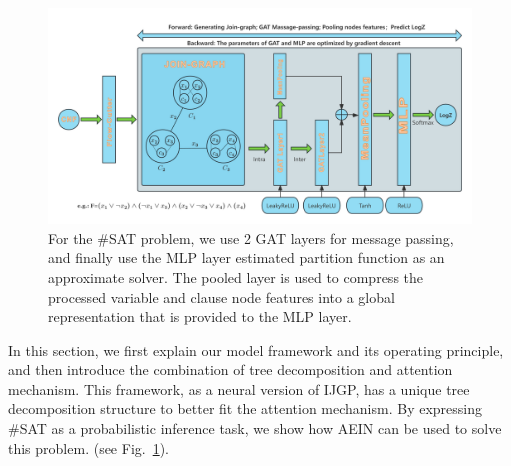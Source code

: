 \begin{figure}[h]
\centering 
\includegraphics[width=1\textwidth]{png/AEIN2.png}
\caption{For the \#SAT problem, we use 2 GAT layers for message passing, and finally use the MLP layer estimated partition function as an approximate solver. The pooled layer is used to compress the processed variable and clause node features into a global representation that is provided to the MLP layer.} \label{fig1}
\end{figure}
In this section, we first explain our model framework and its operating principle, and then introduce the combination of tree decomposition and attention mechanism. This framework, as a neural version of IJGP, has a unique tree decomposition structure to better fit the attention mechanism. By expressing \#SAT as a probabilistic inference task, we show how AEIN can be used to solve this problem. (see Fig.~\ref{fig1}).
